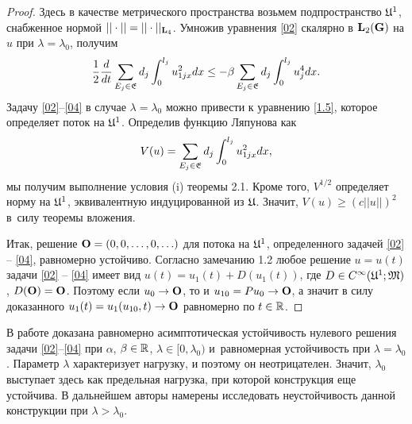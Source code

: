 \begin{proof} Здесь в качестве метрического пространства возьмем подпространство $\frak U^1$, снабженное нормой $||\cdot||=||\cdot||_{{\bf L}_4}$. Умножив уравнения \eqref{02} скалярно в ${\bf L}_2 ({\bf G})$ на $u$ при $\lambda=\lambda_0$, получим \begin{equation}\frac{1}{2}\frac{d}{dt} \sum_{E_j\in\frak E}d_j \int_0^{l_j} u^2_{1jx} dx\leq -\beta\sum_{E_j\in\frak E}d_j \int_0^{l_j} u^4_{j}dx.\label{2.3}\end{equation} Задачу \eqref{02}--\eqref{04} в случае $\lambda =\lambda_0$ можно привести к уравнению \eqref{1.5}, которое определяет поток на $\frak U^1$. 
 Определив функцию Ляпунова как $$V(u)=\sum_{E_j\in\frak E}d_j \int_0^{l_j} u^2_{1jx} dx,$$ мы получим выполнение условия (i) теоремы 2.1. Кроме того, $V^{1/2}$ определяет норму на $\frak U^1$, эквивалентную индуцированной из $\frak U$. Значит, $V(u) \geq (c||u||)^2$ в~силу теоремы вложения.

  Итак, решение  ${\bf O}= (0,0,\ldots,0,\ldots)$ для потока на $\frak U^1$, определенного задачей \eqref{02} -- \eqref{04}, равномерно устойчиво. Согласно замечанию 1.2 любое решение $u=u(t)$ задачи \eqref{02} -- \eqref{04} имеет вид $u(t)=u_1(t)+ D(u_1 (t))$, где $D\in C^\infty (\frak U^1; \frak M)$, $D (\bf O)=\bf O$. Поэтому если $u_0\to {\bf O}$, то и $u_{10}=Pu_0\to {\bf O}$, а значит в силу доказанного $u_1 (t)=u_1 (u_{10}, t)\to \bf O$ равномерно по $t\in\Bbb R$.  \end{proof}

\smallskip

 В работе  доказана равномерно асимптотическая устойчивость нулевого решения задачи \eqref{02}--\eqref{04} при $\alpha$, $\beta\in\Bbb R$, $\lambda\in [0,\lambda_0)$ и~равномерная устойчивость при $\lambda =\lambda_0$.
Параметр $\lambda$ характеризует нагрузку, и поэтому он неотрицателен. 
Значит, $\lambda_0$ выступает здесь как предельная нагрузка, при которой конструкция еще устойчива. В дальнейшем авторы намерены исследовать неустойчивость данной конструкции при $\lambda >\lambda_0$.


